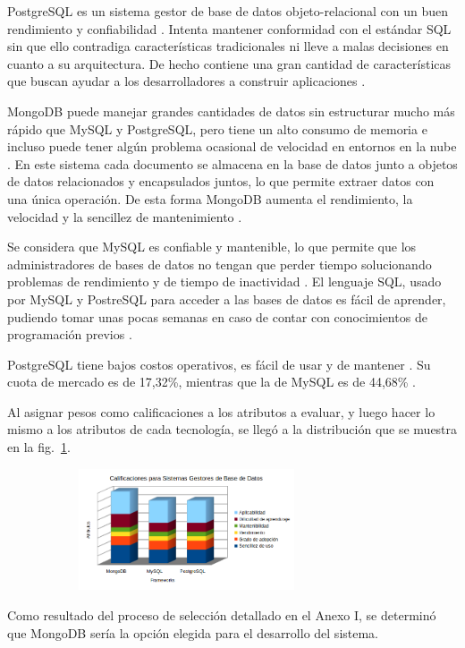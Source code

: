 \documentclass[twoside]{article}
\begin{document}
PostgreSQL es un sistema gestor de base de datos objeto-relacional con un buen rendimiento y confiabilidad \parencite{postgreHome}. Intenta mantener conformidad con el estándar SQL sin que ello contradiga características tradicionales ni lleve a malas decisiones en cuanto a su arquitectura. De hecho contiene una gran cantidad de características que buscan ayudar a los desarrolladores a construir aplicaciones \parencite{postgreAbout}.

MongoDB puede manejar grandes cantidades de datos sin estructurar mucho más rápido que MySQL y PostgreSQL, pero tiene un alto consumo de memoria e incluso puede tener algún problema ocasional de velocidad en entornos en la nube \parencite{mongoMysqlComparison}. En este sistema cada documento se almacena en la base de datos junto a objetos de datos relacionados y encapsulados juntos, lo que permite extraer datos con una única operación. De esta forma MongoDB aumenta el rendimiento, la velocidad y la sencillez de mantenimiento \parencite{vsoftconsultingMongo}.

Se considera que MySQL es confiable y mantenible, lo que permite que los administradores de bases de datos no tengan que perder tiempo solucionando problemas de rendimiento y de tiempo de inactividad \parencite{dbquestMysql}. El lenguaje SQL, usado por MySQL y PostreSQL para acceder a las bases de datos es fácil de aprender, pudiendo tomar unas pocas semanas en caso de contar con conocimientos de programación previos \parencite{thinkfulSql}.

PostgreSQL tiene bajos costos operativos, es fácil de usar y de mantener \parencite{topcoderPostgresql}. Su cuota de mercado es de 17,32\%, mientras que la de MySQL es de 44,68\% \parencite{marketShareDb}.

Al asignar pesos como calificaciones a los atributos a evaluar, y luego hacer lo mismo a los atributos de cada tecnología, se llegó a la distribución que se muestra en la fig.~\ref{fig:dbms}.
\begin{figure}[H]
	\caption{Gráfico de calificaciones para Sistemas Gestores de Base de Datos}
    \begin{subfigure}{1\textwidth}
	\includegraphics[width=0.7\textwidth]{calificaciones para dbms.png}
    \end{subfigure}
	\label{fig:dbms}
\end{figure}
\vspace{-1.0\baselineskip}
Como resultado del proceso de selección detallado en el Anexo I, se determinó que MongoDB sería la opción elegida para el desarrollo del sistema.
\end{document}
